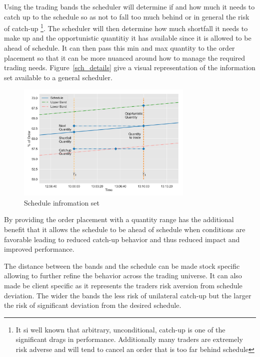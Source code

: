 Using the trading bands the scheduler will determine if and how much it needs to catch up to the schedule so as not to fall too much behind or in general the risk of catch-up \footnote{It si well known that arbitrary, unconditional, catch-up is one of the significant drags in performance. Additionally many traders are extremely risk adverse and will tend to cancel an order that is too far behind schedule}. The scheduler will then determine how much shortfall it needs to make up and the opportunistic quantitiy it has available since it is allowed to be ahead of schedule. It can then pass this min and max quantity to the order placement so that it can be more nuanced around how to manage the required trading needs. Figure~\ref{sch_details} give a visual representation of the information set available to a general scheduler.

\begin{figure}[!ht]
	\centering
	\includegraphics[width=0.75\textwidth]{chapters/chapter_exec_models/figures/schedule_details.png} 
	\caption{Schedule infromation set \label{fig:sch_details}}
	\end{figure}

By providing the order placement with a quantity range has the additional benefit that it allows the schedule to be ahead of schedule when conditions are favorable leading to reduced catch-up behavior and thus reduced impact and improved performance.

The distance between the bands and the schedule can be made stock specific allowing to further refine the behavior across the trading universe.  It can also made be client specific as it represents the traders risk aversion from schedule deviation. The wider the bands the less risk of unilateral catch-up but the larger the risk of significant deviation from the desired schedule.\\

